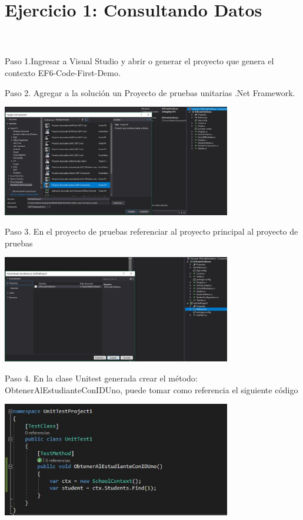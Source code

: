 \section{Ejercicio 1: Consultando Datos} 

\textbf{}\\
\textbf{}\\
Paso 1.Ingresar a Visual Studio y abrir o generar el proyecto que genera el contexto EF6-Code-First-Demo.

Paso 2. Agregar a la solución un Proyecto de pruebas unitarias .Net Framework.

\begin{center}
	\includegraphics[width=10cm]{./Imagenes/Captura1} 
	\end{center}

Paso 3. En el proyecto de pruebas referenciar al proyecto principal al proyecto de pruebas

\begin{center}
	\includegraphics[width=10cm]{./Imagenes/Captura2} 
	\end{center}

Paso 4. En la clase Unitest generada crear el método: ObtenerAlEstudianteConIDUno, puede tomar como
referencia el siguiente código

\begin{center}
	\includegraphics[width=10cm]{./Imagenes/Captura3} 
	\end{center}

